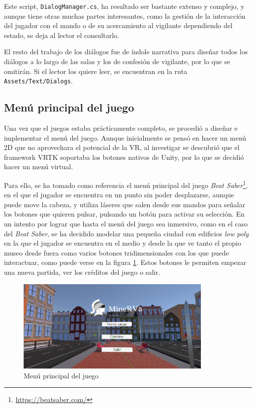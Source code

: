 Este script, \texttt{DialogManager.cs}, ha resultado ser bastante extenso y complejo, y aunque tiene otras muchas partes interesantes, como la gestión de la interacción del jugador con el mando o de su acercamiento al vigilante dependiendo del estado, se deja al lector el consultarlo.

El resto del trabajo de los diálogos fue de índole narrativa para diseñar todos los diálogos a lo largo de las salas y los de confesión de vigilante, por lo que se omitirán. Si el lector los quiere leer, se encuentran en la ruta \texttt{Assets/Text/Dialogs}.

\subsection{Menú principal del juego}

Una vez que el juegos estaba prácticamente completo, se procedió a diseñar e implementar el menú del juego. Aunque inicialmente se pensó en hacer un menú 2D que no aprovechara el potencial de la \acs{VR}, al investigar se descubrió que el framework \acs{VRTK} soportaba los botones nativos de Unity, por lo que se decidió hacer un menú virtual.

Para ello, se ha tomado como referencia el menú principal del juego \textit{Beat Saber}\footnote{\url{https://beatsaber.com/}}, en el que el jugador se encuentra en un punto sin poder desplazarse, aunque puede move la cabeza, y utiliza láseres que salen desde sus mandos para señalar los botones que quieren pulsar, pulsando un botón para activar su selección. En un intento por lograr que hasta el menú del juego sea inmersivo, como en el caso del \textit{Beat Saber}, se ha decidido modelar una pequeña ciudad con edificios \textit{low poly} en la que el jugador se encuentra en el medio y desde la que ve tanto el propio museo desde fuera como varios botones tridimensionales con los que puede interactuar, como puede verse en la figura \ref{fig:main-menu}. Estos botones le permiten empezar una nueva partida, ver los créditos del juego o salir.

\begin{figure}[!h]
\begin{center}
\includegraphics[width=0.85\textwidth]{imagenes/7/salas-unity/unity-menu.png}
\caption{Menú principal del juego}
\label{fig:main-menu}
\end{center}
\end{figure}


